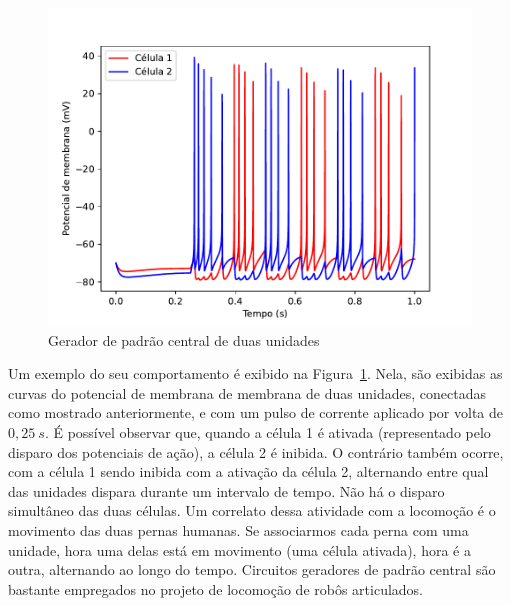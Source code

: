 \begin{figure}[tb]
	\centering
	\caption[Gerador de padrão central de duas unidades]{Gerador de padrão central de duas unidades}
	\label{fig:cpg}
	\includegraphics[width=0.7\linewidth]{figs/cpg}
\end{figure}
Um exemplo do seu comportamento é exibido na Figura~\ref{fig:cpg}. Nela, são exibidas as curvas do potencial de membrana de membrana de duas unidades, conectadas como mostrado anteriormente, e com um pulso de corrente aplicado por volta de $0,25\ s$. É possível observar que, quando a célula 1 é ativada (representado pelo disparo dos potenciais de ação), a célula 2 é inibida. O contrário também ocorre, com a célula 1 sendo inibida com a ativação da célula 2, alternando entre qual das unidades dispara durante um intervalo de tempo. Não há o disparo simultâneo das duas células. Um correlato dessa atividade com a locomoção é o movimento das duas pernas humanas. Se associarmos cada perna com uma unidade, hora uma delas está em movimento (uma célula ativada), hora é a outra, alternando ao longo do tempo. Circuitos geradores de padrão central são bastante empregados no projeto de locomoção de robôs articulados.

